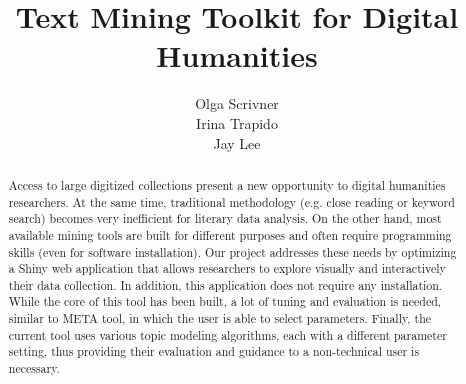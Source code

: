 \documentclass{sig-alternate}
\begin{document}
%

\title{Text Mining Toolkit for Digital Humanities}



%
\author{

\alignauthor
Olga Scrivner\\
\alignauthor
Irina Trapido\\
\alignauthor Jay Lee \\

}

\date{}


\maketitle
\begin{abstract}
Access to large digitized collections present a new opportunity to digital humanities researchers. At the same time, traditional methodology (e.g. close reading or keyword search) becomes very inefficient for literary data analysis. On the other hand, most available mining tools are built for different purposes and often require programming skills (even for software installation). Our project addresses these needs by optimizing a Shiny web application  that allows researchers to explore visually  and interactively their data collection. In addition, this application does not require any installation. While the core of this tool has been built, a lot of tuning and evaluation is needed, similar to META tool, in which  the user is able to select parameters. Finally, the current tool uses various topic modeling algorithms, each with a different parameter setting, thus providing their evaluation and guidance to a non-technical user is necessary.

\end{abstract}
\end{document}
